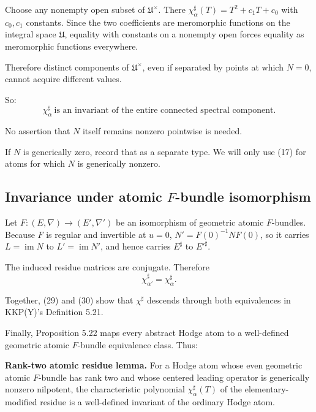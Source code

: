 \documentclass[11pt]{article}
\theoremstyle{definition}
\theoremstyle{remark}
\begin{document}
Choose any nonempty open subset of $\mathfrak U^\times$. There
$\chi^\sharp_\alpha(T)=T^2+c_1T+c_0$ with $c_0,c_1$ constants. Since the two
coefficients are meromorphic functions on the integral space $\mathfrak U$,
equality with constants on a nonempty open forces equality as meromorphic
functions everywhere.

Therefore distinct components of $\mathfrak U^\times$, even if separated by
points at which $N=0$, cannot acquire different values.

So:
\begin{equation}
  \boxed{\ \chi^\sharp_\alpha\ \text{is an invariant of the entire connected
  spectral component.}\ }
  \tag{29}
\end{equation}

No assertion that $N$ itself remains nonzero pointwise is needed.

If $N$ is generically zero, record that as a separate type. We will only use
(17) for atoms for which $N$ is generically nonzero.

\subsection*{Invariance under atomic $F$-bundle isomorphism}

Let $F:(E,\nabla)\to(E',\nabla')$ be an isomorphism of geometric atomic
$F$-bundles. Because $F$ is regular and invertible at $u=0$,
$N'=F(0)^{-1}NF(0)$, so it carries $L=\operatorname{im}N$ to
$L'=\operatorname{im}N'$, and hence carries $E^\sharp$ to $E'^\sharp$.

The induced residue matrices are conjugate. Therefore
\begin{equation}
  \chi^\sharp_{\alpha'}=\chi^\sharp_\alpha.
  \tag{30}
\end{equation}

Together, (29) and (30) show that $\chi^\sharp$ descends through both
equivalences in KKP(Y)'s Definition 5.21.

Finally, Proposition 5.22 maps every abstract Hodge atom to a well-defined
geometric atomic $F$-bundle equivalence class. Thus:

\medskip
\noindent\textbf{Rank-two atomic residue lemma.} For a Hodge atom whose even
geometric atomic $F$-bundle has rank two and whose centered leading operator is
generically nonzero nilpotent, the characteristic polynomial
$\chi^\sharp_\alpha(T)$ of the elementary-modified residue is a well-defined
invariant of the ordinary Hodge atom.
\medskip
\end{document}
